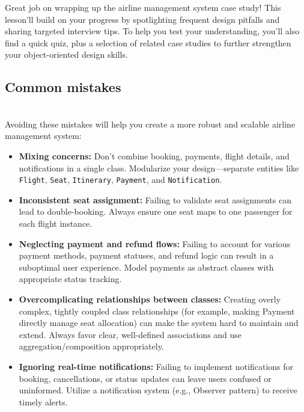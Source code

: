 

Great job on wrapping up the airline management system case study! This lesson'll build on your progress by spotlighting frequent design pitfalls and sharing targeted interview tips. To help you test your understanding, you'll also find a quick quiz, plus a selection of related case studies to further strengthen your object-oriented design skills.

\subsection{Common mistakes}\label{HN-218aJDxRJRAENk_8Lp}
\\
Avoiding these mistakes will help you create a more robust and scalable airline management system:

\begin{itemize}
\item
\protect{}\label{BKLf5YKB3R-Bd7E0j-Myc}
\textbf{Mixing concerns:} Don't combine booking, payments, flight details, and notifications in a single class. Modularize your design---separate entities like \texttt{Flight}, \texttt{Seat}, \texttt{Itinerary}, \texttt{Payment}, and \texttt{Notification}.
\item
\textbf{Inconsistent seat assignment:} Failing to validate seat assignments can lead to double-booking. Always ensure one seat maps to one passenger for each flight instance.
\item
\textbf{Neglecting payment and refund flows:} Failing to account for various payment methods, payment statuses, and refund logic can result in a suboptimal user experience. Model payments as abstract classes with appropriate status tracking.
\item
\textbf{Overcomplicating relationships between classes:} Creating overly complex, tightly coupled class relationships (for example, making Payment directly manage seat allocation) can make the system hard to maintain and extend. Always favor clear, well-defined associations and use aggregation/composition appropriately.
\item
\protect{}\label{ttOfnloOOJxpK0ocU_VFg}
\textbf{Ignoring real-time notifications:} Failing to implement notifications for booking, cancellations, or status updates can leave users confused or uninformed. Utilize a notification system (e.g., Observer pattern) to receive timely alerts.
\end{itemize}

